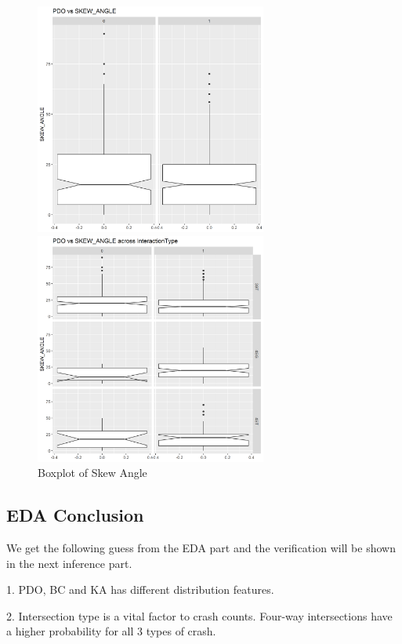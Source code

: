 \documentclass[11pt]{scrartcl} %
\begin{document}
\begin{figure}[H]
\begin{minipage}[t]{0.5\linewidth}
\centering
\includegraphics[width=3in]{image/angle_all_pdo.png}
\small
\end{minipage}
\begin{minipage}[t]{0.5\linewidth}
\centering
\includegraphics[width=3in]{image/angle_pdo.png}
\small
\end{minipage}
\caption{Boxplot of Skew Angle}
\end{figure}

\subsection{EDA Conclusion}

We get the following guess from the EDA part and the verification will be shown in the next inference part.

1. PDO, BC and KA has different distribution features.

2. Intersection type is a vital factor to crash counts. Four-way intersections have a higher probability for all 3 types of crash.
\end{document}

